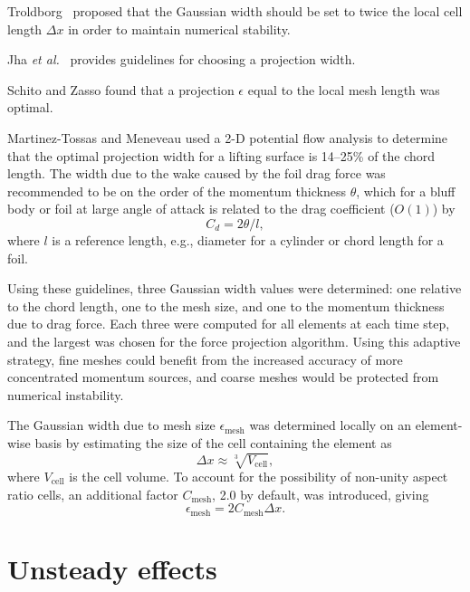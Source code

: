 Troldborg~\cite{Troldborg2008} proposed that the Gaussian width should be set to
twice the local cell length $\Delta x$ in order to maintain numerical stability.

Jha \emph{et al.}~\cite{Jha2014} provides guidelines for choosing a projection
width.

Schito and Zasso \cite{Schito2014} found that a projection $\epsilon$ equal to
the local mesh length was optimal.

Martinez-Tossas and Meneveau \cite{Martinez-Tossas2015b} used a 2-D potential
flow analysis to determine that the optimal projection width for a lifting
surface is 14--25\% of the chord length. The width due to the wake caused by the
foil drag force was recommended to be on the order of the momentum thickness
$\theta$, which for a bluff body or foil at large angle of attack is related to
the drag coefficient ($O(1)$) by \cite{TennekesAndLumley}
\begin{equation}
    C_d = 2 \theta / l,
    \label{eq:mom-thickness}
\end{equation}
where $l$ is a reference length, e.g., diameter for a cylinder or chord length
for a foil.

Using these guidelines, three Gaussian width values were determined: one
relative to the chord length, one to the mesh size, and one to the momentum
thickness due to drag force. Each three were computed for all elements at each
time step, and the largest was chosen for the force projection algorithm. Using
this adaptive strategy, fine meshes could benefit from the increased accuracy of
more concentrated momentum sources, and coarse meshes would be protected from
numerical instability.

The Gaussian width due to mesh size $\epsilon_{\mathrm{mesh}}$ was determined
locally on an element-wise basis by estimating the size of the cell containing
the element as
\begin{equation}
    \Delta x \approx \sqrt[3]{V_\mathrm{cell}},
\end{equation}
where $V_\mathrm{cell}$ is the cell volume. To account for the possibility of non-unity aspect ratio cells, an additional factor $C_\mathrm{mesh}$, 2.0 by default, was introduced, giving
\begin{equation}
    \epsilon_{\mathrm{mesh}} = 2C_\mathrm{mesh} \Delta x.
\end{equation}


\section{Unsteady effects}

